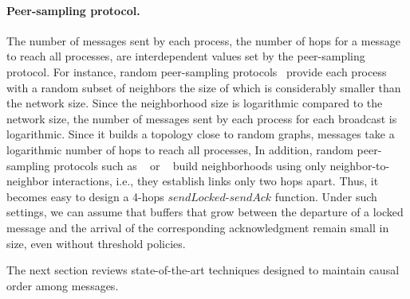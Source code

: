 \paragraph{Peer-sampling protocol.} The number of messages sent by each process,
the number of hops for a message to reach all processes,  are
interdependent values set by the peer-sampling protocol. For instance, random
peer-sampling protocols~\cite{jelasity2007gossip} provide each process with a
random subset of neighbors the size of which is considerably smaller than the
network size. Since the neighborhood size is logarithmic compared to the network
size, the number of messages sent by each process for each broadcast is
logarithmic. Since it builds a topology close to random graphs, messages take a
logarithmic number of hops to reach all processes,   In addition,
random peer-sampling protocols such as \SPRAY~\cite{nedelec2017adaptive} or
\CYCLON~\cite{voulgaris2005cyclon} build neighborhoods using only
neighbor-to-neighbor interactions, i.e., they establish links only two hops
apart. Thus, it becomes easy to design a 4-hops $sendLocked$-$sendAck$
function. Under such settings, we can assume that buffers that grow between the
departure of a locked message and the arrival of the corresponding
acknowledgment remain small in size, even without threshold policies.

The next section reviews state-of-the-art techniques designed to maintain causal
order among messages.

